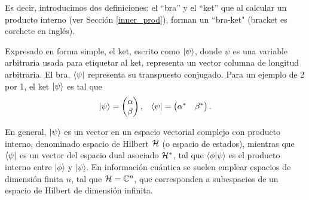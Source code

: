 Es decir, introducimos dos definiciones: el ``bra''  y el ``ket''  que al calcular un producto interno (ver Sección \ref{inner_prod}), forman un  ``bra-ket"  (bracket es corchete en inglés). 

Expresado en forma simple, el ket, escrito como $\ket{\psi}$, donde $\psi$ es una variable arbitraria usada para etiquetar al ket, representa un vector columna de longitud arbitraria. El bra, $\bra{\psi}$ representa su transpuesto conjugado. Para un ejemplo de 2 por 1, el ket $\ket{\psi}$ es tal que
\begin{align}
    \ket{\psi} = 
    \begin{pmatrix}
        \alpha \\
        \beta \\
    \end{pmatrix},\;\;\;
    \bra{\psi} = 
    \begin{pmatrix}
        \alpha^\ast & \beta^\ast
    \end{pmatrix}. \nonumber
\end{align}

En general, $\ket{\psi}$ es un vector en un espacio vectorial complejo con producto interno, denominado espacio de Hilbert ${\cal H}$ (o espacio de estados),  mientras que $\bra{\psi}$ es un vector del espacio dual asociado ${\cal H}^*$, tal que $\langle \phi|\psi\rangle$ es el producto interno entre $|\phi\rangle$ y $|\psi\rangle$. En informaci\'on cu\'antica se suelen emplear espacios de  dimensi\'on finita $n$, tal que ${\cal H}=\mathbb{C}^n$, que corresponden a subespacios de un espacio de Hilbert de dimensi\'on infinita. 
\vspace*{-.25cm}

